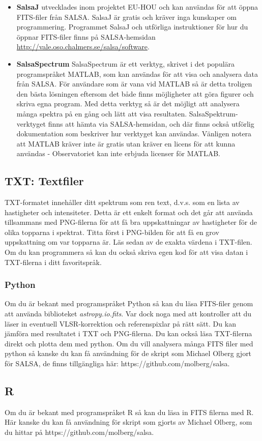 \begin{itemize}
	\item \textbf{SalsaJ} utvecklades inom projektet EU-HOU och kan användas 
		för att öppna FITS-filer från SALSA.
		SalsaJ är gratis och kräver inga kunskaper om programmering. Programmet SalsaJ och utförliga instruktioner för hur du öppnar FITS-filer finns
		på SALSA-hemsidan {\url{http://vale.oso.chalmers.se/salsa/software}}.
	\item \textbf{SalsaSpectrum} SalsaSpectrum är ett verktyg, skrivet i det
		populära programspråket MATLAB, som kan användas för att visa och
		analysera data från SALSA. För användare som är vana vid MATLAB så är
		detta troligen den bästa lösningen eftersom det både finns möjligheter
		att göra figurer och skriva egna program. Med detta verktyg så är det
		möjligt att analysera många spektra på en gång och lätt att visa
		resultaten.  SalsaSpektrum-verktyget finns att hämta via
		SALSA-hemsidan, och där finns också utförlig dokumentation som
		beskriver hur verktyget kan användas. Vänligen notera att MATLAB kräver
		inte är gratis utan kräver en licens för att kunna användas -
		Observatoriet kan inte erbjuda licenser för MATLAB.
\end{itemize}

\subsection{TXT: Textfiler}
TXT-formatet innehåller ditt spektrum som ren text, d.v.s. som en lista av
hastigheter och intensiteter. Detta är ett enkelt format och det går att använda 
tillsammans med PNG-filerna för att få bra uppskattningar av hastigheter för de olika
topparna i spektrat. Titta först i PNG-bilden för att få en grov uppskattning om var topparna är.
Läs sedan av de exakta värdena i TXT-filen. 
Om du kan programmera så kan du också skriva egen
kod för att visa datan i TXT-filerna i ditt favoritspråk. 

\subsubsection{Python}
Om du är bekant med programspråket Python så kan du läsa FITS-filer genom att
använda biblioteket \emph{astropy.io.fits}. Var dock noga med att kontroller
att du läser in eventuell VLSR-korrektion och referenspixlar på rätt sätt. Du
kan jämföra med resultatet i TXT och PNG-filerna.  Du kan också läsa
TXT-filerna direkt och plotta dem med python.  Om du vill analysera många FITS
filer med python så kanske du kan få användning för de skript som Michael
Olberg gjort för SALSA, de finns tillgängliga här:
https://github.com/molberg/salsa.

\subsection{R}
Om du är bekant med programspråket R så kan du läsa in FITS filerna med R. 
Här kanske du kan få användning för skript som gjorts av Michael Olberg, 
som du hittar på https://github.com/molberg/salsa.
